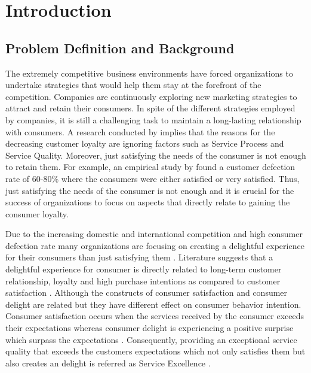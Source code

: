 \chapter{Introduction} \label{chap:intro}
\onehalfspacing
\section{Problem Definition and Background} \label{sect:thefirst} 
The extremely competitive business environments have forced organizations to undertake strategies that would help them stay at the forefront of the competition. Companies are continuously exploring new marketing strategies to attract and retain their consumers. In spite of the different strategies employed by companies, it is still a challenging task to maintain a long-lasting relationship with consumers. A research conducted by \textcite[8-9]{Aziz2009} implies that the reasons for the decreasing customer loyalty are ignoring factors such as Service Process and Service Quality. Moreover, just satisfying the needs of the consumer is not enough to retain them. For example, an empirical study by \textcite[135]{Reichheld2000} found a customer defection rate of 60-80\% where the consumers were either satisfied or very satisfied. Thus, just satisfying the needs of the consumer is not enough and it is crucial for the success of organizations to focus on aspects that directly relate to gaining the consumer loyalty.\\ \par
\noindent
Due to the increasing domestic and international competition and high consumer defection rate many organizations are focusing on creating a delightful experience for their consumers than just satisfying them \autocite[386]{Bartl2013}. Literature suggests that a delightful experience for consumer is directly related to long-term customer relationship, loyalty and high purchase intentions as compared to customer satisfaction \autocite[386]{Bartl2013}. Although the constructs of consumer satisfaction and consumer delight are related but they have different effect on consumer behavior intention\autocite[392]{Bartl2013}. Consumer satisfaction occurs when the services received by the consumer exceeds their expectations whereas consumer delight is experiencing a positive surprise which surpass the expectations \autocite[129]{Matzler1996}. Consequently, providing an exceptional service quality that exceeds the customers expectations which not only satisfies them but also creates an delight is referred as Service Excellence \autocite[475]{Horwitz1996}. \\ \par
